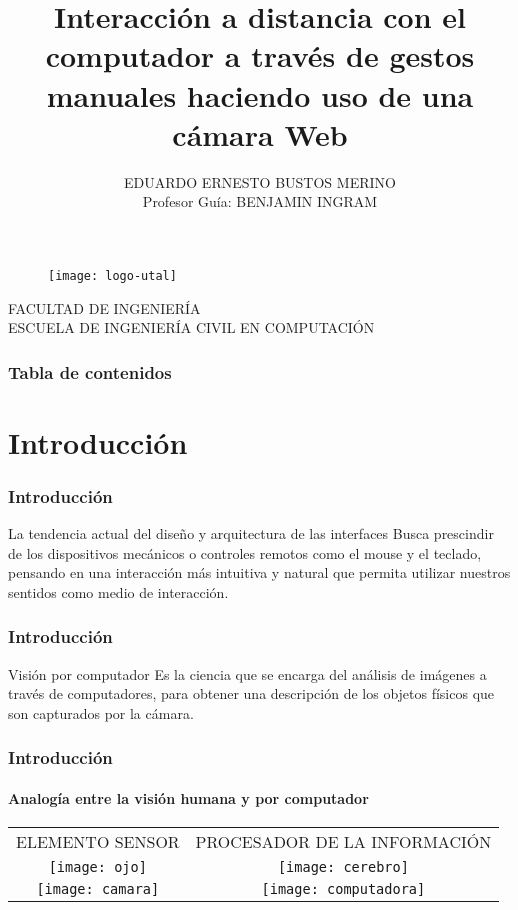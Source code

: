 \documentclass[xcolor=dvipsnames]{beamer}
\title[Interacción a través de gestos]{Interacción a distancia con el computador a través de gestos manuales haciendo uso de una cámara Web}
\author[Eduardo Bustos]{
EDUARDO ERNESTO BUSTOS MERINO\\
\vspace*{1cm}
Profesor Guía: BENJAMIN INGRAM}
\date{}
\institute[Universidad de Talca]{}
\begin{document}
	
	\begin{frame}[plain]
		\begin{center}
			\begin{figure}[h]
				\texttt{[image: logo-utal]}
			\end{figure}
			
			{\tiny{FACULTAD DE INGENIERÍA\\ ESCUELA DE INGENIERÍA CIVIL EN COMPUTACIÓN}}
		\end{center}
		\titlepage
	\end{frame}

	\begin{frame}
		\transdissolve
		\frametitle{Tabla de contenidos}
		\tableofcontents[pausesections]
	\end{frame}

	\section{Introducción}
	\begin{frame}
		\transdissolve
		\frametitle{Introducción}
		\begin{block}{La tendencia actual del diseño y arquitectura de las interfaces}
		Busca prescindir de los dispositivos mecánicos o controles remotos como el mouse y el teclado, pensando en una interacción más intuitiva y natural que permita utilizar nuestros sentidos como medio de interacción.
		\end{block}
	\end{frame}

	\begin{frame}
		\transdissolve
		\frametitle{Introducción}
		\begin{block}{Visión por computador}
		Es la ciencia que se encarga del análisis de imágenes a través de computadores, para obtener una descripción de los objetos físicos que son capturados por la cámara.
		\end{block}
	\end{frame}

	\begin{frame}
		\transdissolve
		\frametitle{Introducción}
		\framesubtitle{Analogía entre la visión humana y por computador}
		\begin{center}
			\begin{tabular}{cc}
			{\tiny{ELEMENTO SENSOR}} & {\tiny{PROCESADOR DE LA INFORMACIÓN}}\\
			\texttt{[image: ojo]}    & \texttt{[image: cerebro]}\\
			\texttt{[image: camara]} & \texttt{[image: computadora]}\\
			\end{tabular}
		\end{center}
	\end{frame}
\end{document}
